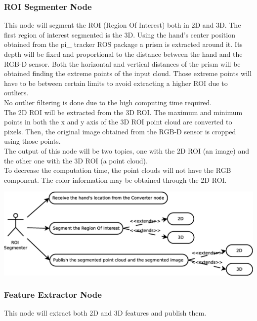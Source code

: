 \documentclass{article}
\begin{document}
\subsubsection{ROI Segmenter Node}
This node will segment the ROI (Region Of Interest) both in 2D and 3D.
The first region of interest segmented is the 3D. Using the hand's center position obtained from the pi\_ tracker ROS package a prism is extracted around it. Its depth will be fixed and proportional to the distance between the hand and the RGB-D sensor. Both the horizontal and vertical distances of the prism will be obtained finding the extreme points of the input cloud. Those extreme points will have to be between certain limits to avoid extracting a higher ROI due to outliers. 
\\
No outlier filtering is done due to the high computing time required.  
\\
The 2D ROI will be extracted from the 3D ROI. The maximum and minimum points in both the x and y axis of the 3D ROI point cloud are converted to pixels. Then, the original image obtained from the RGB-D sensor is cropped using those points. 
\\
The output of this node will be two topics, one with the 2D ROI (an image) and the other one with the 3D ROI (a point cloud).
\\
To decrease the computation time, the point clouds will not have the RGB component. The color information may be obtained through the 2D ROI. 

\begin{center}
	\includegraphics[scale=0.4]{../diagrams/images/uc_roi_segmenter.eps}
\end{center}

\subsubsection{Feature Extractor Node}
This node will extract both 2D and 3D features and publish them. 
\end{document}
